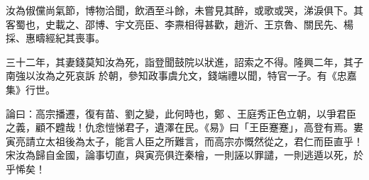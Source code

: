 \begin{pinyinscope}
 汝為俶儻尚氣節，博物洽聞，飲酒至斗餘，未嘗見其醉，或歌或哭，涕淚俱下。其客蜀也，史載之、邵博、宇文亮臣、李燾相得甚歡，趙沂、王京魯、關民先、楊採、惠疇經紀其喪事。



 三十二年，其妻錢莫知汝為死，詣登聞鼓院以狀進，詔索之不得。隆興二年，其子南強以汝為之死哀訴
 於朝，參知政事虞允文，錢端禮以聞，特官一子。有《忠嘉集》行世。



 論曰：高宗播遷，復有苗、劉之變，此何時也，鄭𣪝、王庭秀正色立朝，以爭君臣之義，顧不韙哉！仇悆愷悌君子，遺澤在民。《易》曰「王臣蹇蹇」，高登有焉。婁寅亮請立太祖後為太子，能言人臣之所難言，而高宗亦慨然從之，君仁而臣直乎！宋汝為歸自金國，論事切直，與寅亮俱迕秦檜，一則誣以罪譴，一則逃遁以死，於乎悕矣！



\end{pinyinscope}